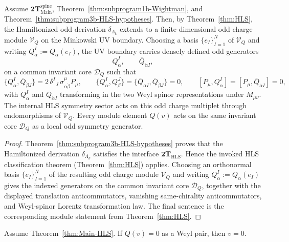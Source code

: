 \begin{theorem}
\label{thm:Main-HLS}
Assume $\mathbf{2T}_{\mathrm{Main}}^{\mathrm{spine}}$, Theorem~\ref{thm:subprogram1b-Wightman},
and Theorem~\ref{thm:subprogram3b-HLS-hypotheses}. Then, by
Theorem~\ref{thm:HLS}, the Hamiltonized odd derivation \(\delta_{\Lambda_k}\) extends
to a finite-dimensional odd charge module \(\mathcal V_Q\) on the
Minkowski UV boundary.  Choosing a basis \(\{e_I\}_{I=1}^N\) of
\(\mathcal V_Q\) and writing \(Q_\alpha^I:=Q_\alpha(e_I)\), the UV
boundary carries densely defined odd generators
\[
Q_\alpha^I,\qquad \bar Q_{\dot\alpha I},
\]
on a common invariant core \(\mathcal D_Q\) such that
\[
\{Q_\alpha^I,\bar Q_{\dot\beta J}\}
=2\,\delta^I{}_J\,\sigma^\mu_{\alpha\dot\beta}P_\mu,
\qquad
\{Q_\alpha^I,Q_\beta^J\}
=\{\bar Q_{\dot\alpha I},\bar Q_{\dot\beta J}\}=0,
\qquad
[P_\mu,Q_\alpha^I]=[P_\mu,\bar Q_{\dot\alpha I}]=0,
\]
with \(Q_\alpha^I\) and \(\bar Q_{\dot\alpha I}\) transforming in the
two Weyl spinor representations under \(M_{\mu\nu}\).  The internal HLS
symmetry sector acts on this odd
charge multiplet through endomorphisms of \(\mathcal V_Q\). Every module
element \(Q(v)\) acts on the same invariant core \(\mathcal D_Q\) as a local odd
symmetry generator.
\end{theorem}

\begin{proof}
Theorem~\ref{thm:subprogram3b-HLS-hypotheses} proves that the Hamiltonized
derivation \(\delta_{\Lambda_k}\) satisfies the interface
\(\mathbf{2T}_{\mathrm{HLS}}\). Hence the invoked HLS classification theorem
\textnormal{(Theorem~\ref{thm:HLS})} applies. Choosing an orthonormal basis
\(\{e_I\}_{I=1}^N\) of the resulting odd charge module \(\mathcal V_Q\) and writing
\(Q_\alpha^I:=Q_\alpha(e_I)\) gives the indexed generators on the common invariant
core \(\mathcal D_Q\), together with the displayed translation anticommutators,
vanishing same-chirality anticommutators, and Weyl-spinor Lorentz transformation
law. The final sentence is the corresponding module statement from
Theorem~\ref{thm:HLS}.
\end{proof}

\begin{lemma}
\label{lem:HLS-module-injective}
Assume Theorem~\ref{thm:Main-HLS}. If \(Q(v)=0\) as a Weyl pair, then \(v=0\).
\end{lemma}

